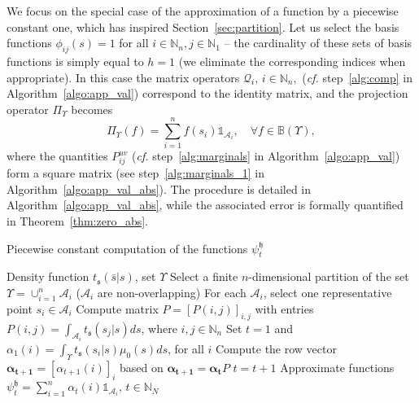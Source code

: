 \documentclass{LMCS}
\def\cf{{\em cf.}\xspace}
\begin{document}
We focus on the special case of the approximation of a function by a piecewise constant one, 
which has inspired Section~\ref{sec:partition}.
Let us select the basis functions $\phi_{ij}(s) = 1$ for all $i\in\mathbb N_n,j\in\mathbb N_1$ -- 
the cardinality of these sets of basis functions is simply equal to $h=1$  
(we eliminate the corresponding indices when appropriate).  
In this case the matrix operators $\mathcal Q_i,\,i\in\mathbb N_n,$ (\cf step~\ref{alg:comp} in Algorithm~\ref{algo:app_val}) correspond to the identity matrix, 
and the projection operator $\Pi_{\Upsilon}$ becomes 
\begin{equation}
\label{eq:proj_piecewise_constant}
\Pi_{\Upsilon}(f) = \sum_{i=1}^n f(s_i)\mathds{1}_{\mathcal A_i},\quad \forall f\in\mathbb B(\Upsilon),
\end{equation}
where the quantities $P_{ij}^{uv}$ (\cf step~\ref{alg:marginals} in Algorithm~\ref{algo:app_val}) form a square matrix 
(see step~\ref{alg:marginals_1} in Algorithm~\ref{algo:app_val_abs}).   
The procedure is detailed in Algorithm~\ref{algo:app_val_abs},
while the associated error is formally quantified in Theorem~\ref{thm:zero_abs}.
\begin{algorithm}
\caption{Piecewise constant computation of the functions $\psi^{\mathfrak h}_{t}$}  
\label{algo:app_val_abs}
\begin{center}
\begin{algorithmic}[1]
\REQUIRE 
Density function $t_{\mathfrak s}(\bar s|s)$, set $\Upsilon$
\STATE
Select a finite $n$-dimensional partition of the set $\Upsilon = \cup_{i=1}^{n}\mathcal A_i$
($\mathcal A_i$ are non-overlapping)
\STATE
For each $\mathcal A_i$, select one representative point $s_i\in \mathcal A_i$
\STATE \label{alg:marginals_1}
Compute matrix $P = [P(i,j)]_{i,j}$ with entries $P(i,j) = \int_{\mathcal A_i}t_{\mathfrak s}(s_j|s)ds$, where $i,j\in\mathbb N_n$
\STATE Set $t=1$ and $\alpha_1(i) = \int_{\Upsilon}t_{\mathfrak s}(s_i|s)\mu_0(s)ds$, for all $i$
\STATE
Compute the row vector $\boldsymbol{\alpha_{t+1}} = [\alpha_{t+1}(i)]_i$ based on $\boldsymbol{\alpha_{t+1}} = \boldsymbol{\alpha_t}P$
\STATE
$t = t+1$
\ENDIF
\ENSURE
Approximate functions $\psi^{\mathfrak h}_t = \sum_{i=1}^{n}\alpha_t(i)\mathds{1}_{\mathcal A_i},\, t\in\mathbb N_N$
\end{algorithmic}
\end{center}
\end{algorithm}
\end{document}
